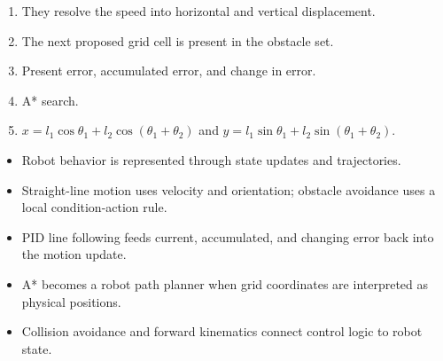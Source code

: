 \begin{checkanswers}
\begin{enumerate}
  \item They resolve the speed into horizontal and vertical displacement.
  \item The next proposed grid cell is present in the obstacle set.
  \item Present error, accumulated error, and change in error.
  \item A* search.
  \item \(x=l_1\cos\theta_1+l_2\cos(\theta_1+\theta_2)\) and \(y=l_1\sin\theta_1+l_2\sin(\theta_1+\theta_2)\).
\end{enumerate}
\end{checkanswers}

\begin{chapterrecap}
\begin{itemize}
  \item Robot behavior is represented through state updates and trajectories.
  \item Straight-line motion uses velocity and orientation; obstacle avoidance uses a local condition-action rule.
  \item PID line following feeds current, accumulated, and changing error back into the motion update.
  \item A* becomes a robot path planner when grid coordinates are interpreted as physical positions.
  \item Collision avoidance and forward kinematics connect control logic to robot state.
\end{itemize}
\end{chapterrecap}
